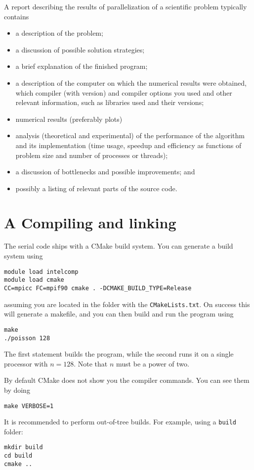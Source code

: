 \documentclass[onecolumn, oneside, a4paper, 11pt]{memoir}
\theoremstyle{remark}
\begin{document}
A report describing the results of parallelization of a scientific problem
typically contains
\begin{itemize}
\item a description of the problem;
\item a discussion of possible solution strategies;
\item a brief explanation of the finished program;
\item a description of the computer on which the numerical results were
  obtained, which compiler (with version) and compiler options you used and
  other relevant information, such as libraries used and their versions;
\item numerical results (preferably plots)
\item analysis (theoretical and experimental) of the performance of the
  algorithm and its implementation (time usage, speedup and efficiency as
  functions of problem size and number of processes or threads);
\item a discussion of bottlenecks and possible improvements; and
\item possibly a listing of relevant parts of the source code.
\end{itemize}

\section{A \quad Compiling and linking}

The serial code ships with a CMake build system. You can generate a build system
using
\begin{lstlisting}
module load intelcomp
module load cmake
CC=mpicc FC=mpif90 cmake . -DCMAKE_BUILD_TYPE=Release
\end{lstlisting}
assuming you are located in the folder with the \texttt{CMakeLists.txt}. On
success this will generate a makefile, and you can then build and run the
program using
\begin{lstlisting}
make
./poisson 128
\end{lstlisting}
The first statement builds the program, while the second runs it on a single
processor with $n=128$. Note that $n$ must be a power of two.

By default CMake does not show you the compiler commands. You can see them by doing
\begin{lstlisting}
make VERBOSE=1
\end{lstlisting}

It is recommended to perform out-of-tree builds. For example, using a
\texttt{build} folder:
\begin{lstlisting}
mkdir build
cd build
cmake ..
\end{lstlisting}
\end{document}
